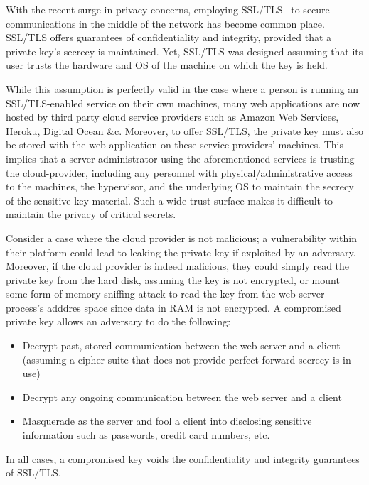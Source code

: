 \documentclass[../main.tex]{subfiles}
\begin{document}
With the recent surge in privacy concerns, employing
SSL/TLS~\cite{sslrfc,sslbook} to secure communications in the middle
of the network has become common place. SSL/TLS offers guarantees of
confidentiality and integrity, provided that a private key's secrecy
is maintained. Yet, SSL/TLS was designed assuming that its user trusts
the hardware and OS of the machine on which the key is held.
 
While this assumption is perfectly valid in the case where a person is
running an SSL/TLS-enabled service on their own machines, many web
applications are now hosted by third party cloud service providers
such as Amazon Web Services, Heroku, Digital Ocean \&c. Moreover, to
offer SSL/TLS, the private key must also be stored with the web
application on these service providers' machines. This implies that a
server administrator using the aforementioned services is trusting the
cloud-provider, including any personnel with physical/administrative
access to the machines, the hypervisor, and the underlying OS to
maintain the secrecy of the sensitive key material. Such a wide trust
surface makes it difficult to maintain the privacy of critical
secrets.

Consider a case where the cloud provider is not malicious; a
vulnerability within their platform could lead to leaking the private
key if exploited by an adversary. Moreover, if the cloud provider is
indeed malicious, they could simply read the private key from the hard
disk, assuming the key is not encrypted, or mount some form of memory
sniffing attack to read the key from the web server process's
adddres space since data in RAM is not encrypted. A compromised private key
allows an adversary to do the following:
\begin{itemize}
  \item Decrypt past, stored communication between the web server and a
    client (assuming a cipher suite that does not provide perfect forward
    secrecy is in use)
  \item Decrypt any ongoing communication between the web server and a
    client
  \item Masquerade as the server and fool a client into disclosing
    sensitive information such as passwords, credit card numbers, etc.
\end{itemize}
In all cases, a compromised key voids the confidentiality and integrity
guarantees of SSL/TLS.
\end{document}
